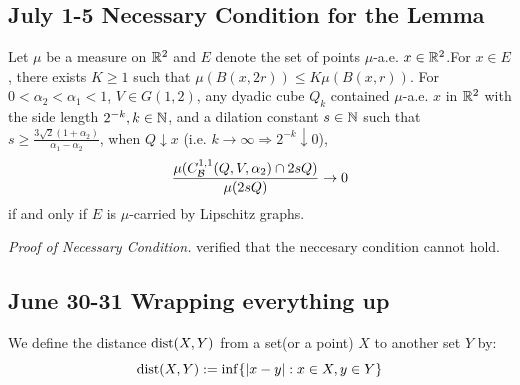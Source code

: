 \newpage
\subsection{July 1-5 Necessary Condition for the Lemma}
\begin{lemma}
    Let $\mu$ be a measure on $\mathbb{R}^2$ and $E$ denote the set of points $\mu$-a.e. $x\in\mathbb{R}^2$.For $x\in E$, there exists $K\geq 1$ such that $\mu(B(x, 2r))\leq K\mu(B(x,r))$. For $0<\alpha_2<\alpha_1<1$, $V\in G(1,2)$, any dyadic cube $Q_k$ contained $\mu$-a.e. $x$ in $\mathbb{R}^2$ with the side length $2^{-k}, k\in\mathbb{N}$, and a dilation constant $s\in\mathbb{N}$ such that $s \geq \frac{3\sqrt{2}(1+\alpha_2)}{\alpha_1-\alpha_2}$, when $Q\downarrow x$ (i.e. $k\rightarrow\infty \Rightarrow 2^{-k}\downarrow 0$),
    \begin{equation}
        \frac{\mu(C_\mathcal B^{1,1}(Q, V, \alpha_2)\cap 2sQ)}{\mu(2sQ)} \rightarrow 0
    \end{equation}
    if and only if $E$ is $\mu$-carried by Lipschitz graphs.
\end{lemma}
\textit{Proof of Necessary Condition.}  verified that the neccesary condition cannot hold. 


\newpage
\subsection{June 30-31 Wrapping everything up}
\begin{definition}[Distance]
    We define the distance $\operatorname{dist}(X, Y)$ from a set(or a point) $X$ to another set $Y$ by:
    \begin{equation*}
        \operatorname{dist}(X, Y) := \inf\{|x-y|:x\in X, y\in Y\}
    \end{equation*}
\end{definition}

